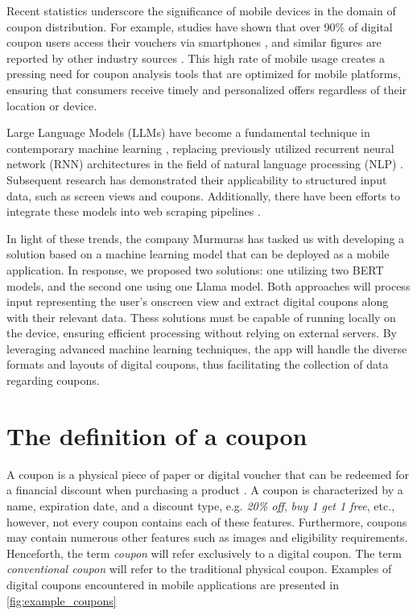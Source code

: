 \documentclass[licencjacka,en]{pracamgr}
\begin{document}
Recent statistics underscore the significance of mobile devices in the domain of coupon distribution. For example, studies have shown that over 90\% of digital coupon users access their vouchers via smartphones \cite{emarketer_coupon_stats}, and similar figures are reported by other industry sources \cite{coupon_stats_2}. This high rate of mobile usage creates a pressing need for coupon analysis tools that are optimized for mobile platforms, ensuring that consumers receive timely and personalized offers regardless of their location or device.

Large Language Models (LLMs) have become a fundamental technique in contemporary machine learning \cite{LLM-popularity}, replacing previously utilized recurrent neural network (RNN) architectures in the field of natural language processing (NLP) \cite{li2024}. Subsequent research \cite{sui2024} has demonstrated their applicability to structured input data, such as screen views and coupons. Additionally, there have been efforts to integrate these models into web scraping pipelines \cite{scapegraph_repo}.

In light of these trends, the company Murmuras has tasked us with developing a solution based on a machine learning model that can be deployed as a mobile application. In response, we proposed two solutions: one utilizing two BERT \cite{BERT_intro} models, and the second one using one Llama model. Both approaches will process input representing the user's onscreen view and extract digital coupons along with their relevant data. Thess solutions must be capable of running locally on the device, ensuring efficient processing without relying on external servers. By leveraging advanced machine learning techniques, the app will handle the diverse formats and layouts of digital coupons, thus facilitating the collection of data regarding coupons.

\section{The definition of a coupon}
A coupon is a physical piece of paper or digital voucher that can be redeemed for a financial discount when purchasing a product \cite{coupon_definition}. A coupon is characterized by a name, expiration date, and a discount type, e.g. \emph{20\% off}, \emph{buy 1 get 1 free}, etc., however, not every coupon contains each of these features. Furthermore, coupons may contain numerous other features such as images and eligibility requirements. Henceforth, the term \emph{coupon} will refer exclusively to a digital coupon. The term \emph{conventional coupon} will refer to the traditional physical coupon. Examples of digital coupons encountered in mobile applications are presented in \ref{fig:example_coupons}
\end{document}
